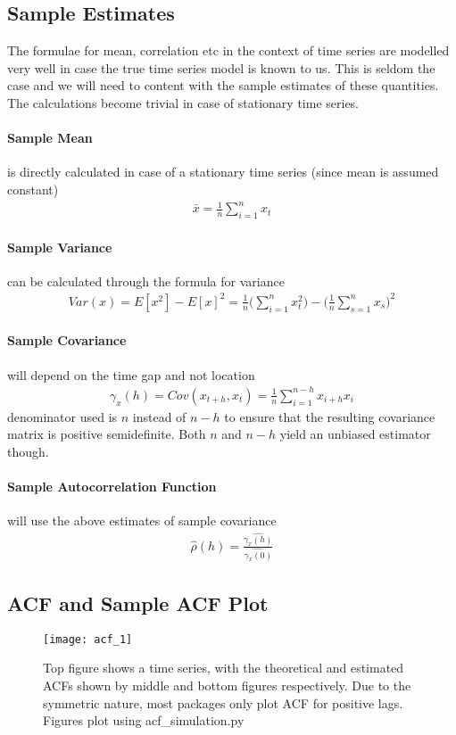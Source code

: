 \documentclass[../../time_series_notes.tex]{subfiles}
\begin{document}
\subsection{Sample Estimates}
The formulae for mean, correlation etc in the context of time series are modelled very well in case the true time series model is known to us. This is seldom the case and we will need to content with the sample estimates of these quantities. The calculations become trivial in case of stationary time series.

\paragraph{Sample Mean} is directly calculated in case of a stationary time series (since mean is assumed constant)
\begin{align*}
    \bar{x} = \frac{1}{n} \sum_{i=1}^{n} x_{t}
\end{align*}
\paragraph{Sample Variance} can be calculated through the formula for variance
\begin{align*}
    Var(x) = E[x^{2}] - E[x]^{2} = \frac{1}{n} \bigg( \sum_{i=1}^{n} x_{t}^{2} \bigg) - \bigg( \frac{1}{n}\sum_{s=1}^{n}x_{s} \bigg)^{2}
\end{align*}
\paragraph{Sample Covariance} will depend on the time gap and not location
\begin{align*}
    \gamma_{x}(h) = Cov(x_{t+h},x_{t}) = \frac{1}{n}\sum_{i=1}^{n-h}x_{i+h}x_{i}
\end{align*}
denominator used is $n$ instead of $n-h$ to ensure that the resulting covariance matrix is positive semidefinite. Both $n$ and $n-h$ yield an unbiased estimator though.
\paragraph{Sample Autocorrelation Function} will use the above estimates of sample covariance
\begin{align*}
    \hat{\rho}(h) = \frac{\hat{\gamma_{x}(h)}}{\hat{\gamma_{x}(0)}}
\end{align*}

\subsection{ACF and Sample ACF Plot}
\begin{figure}[h]
    \texttt{[image: acf\_1]}
    \centering
    \caption {Top figure shows a time series, with the theoretical and estimated ACFs shown by middle and bottom figures respectively. Due to the symmetric nature, most packages only plot ACF for positive lags. Figures plot using acf\_simulation.py}
    \label{fig:acf_1} %
\end{figure}
\end{document}
